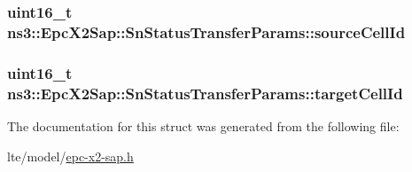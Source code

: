 \subsubsection[{\texorpdfstring{source\+Cell\+Id}{sourceCellId}}]{\setlength{\rightskip}{0pt plus 5cm}uint16\+\_\+t ns3\+::\+Epc\+X2\+Sap\+::\+Sn\+Status\+Transfer\+Params\+::source\+Cell\+Id}\hypertarget{structns3_1_1EpcX2Sap_1_1SnStatusTransferParams_acbd1a1576a0e5487cc20d3f9861821ef}{}\label{structns3_1_1EpcX2Sap_1_1SnStatusTransferParams_acbd1a1576a0e5487cc20d3f9861821ef}
\subsubsection[{\texorpdfstring{target\+Cell\+Id}{targetCellId}}]{\setlength{\rightskip}{0pt plus 5cm}uint16\+\_\+t ns3\+::\+Epc\+X2\+Sap\+::\+Sn\+Status\+Transfer\+Params\+::target\+Cell\+Id}\hypertarget{structns3_1_1EpcX2Sap_1_1SnStatusTransferParams_a89e385b30db3082f394b5a3470d5c230}{}\label{structns3_1_1EpcX2Sap_1_1SnStatusTransferParams_a89e385b30db3082f394b5a3470d5c230}


The documentation for this struct was generated from the following file\+:\begin{DoxyCompactItemize}
\item 
lte/model/\hyperlink{epc-x2-sap_8h}{epc-\/x2-\/sap.\+h}\end{DoxyCompactItemize}
